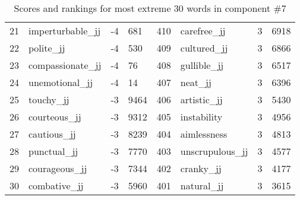 \begin{table}[tbp]
\begin{tabular}{| rlr@{.}l | rlr@{.}l |}
    21 & imperturbable\_jj & -4 & 681    &    410 & carefree\_jj & 3 & 6918 \\
    22 & polite\_jj & -4 & 530    &    409 & cultured\_jj & 3 & 6866 \\
    23 & compassionate\_jj & -4 & 76    &    408 & gullible\_jj & 3 & 6517 \\
    24 & unemotional\_jj & -4 & 14    &    407 & neat\_jj & 3 & 6396 \\
    25 & touchy\_jj & -3 & 9464    &    406 & artistic\_jj & 3 & 5430 \\
    26 & courteous\_jj & -3 & 9312    &    405 & instability & 3 & 4956 \\
    27 & cautious\_jj & -3 & 8239    &    404 & aimlessness & 3 & 4813 \\
    28 & punctual\_jj & -3 & 7770    &    403 & unscrupulous\_jj & 3 & 4577 \\
    29 & courageous\_jj & -3 & 7344    &    402 & cranky\_jj & 3 & 4177 \\
    30 & combative\_jj & -3 & 5960    &    401 & natural\_jj & 3 & 3615 \\
    \hline
    \end{tabular}
    \caption{Scores and rankings for most extreme 30 words in component \#7} 
\end{table}
\clearpage
